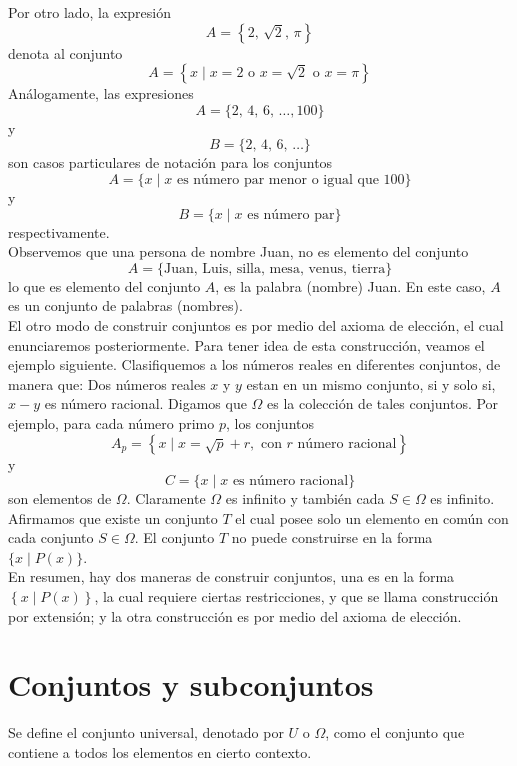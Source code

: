 Por otro lado, la expresión
$$A=\left\{2, \, \sqrt{2}, \, \pi \right\} $$
denota al conjunto
$$ A=\left\{x \mid x=2 \text { o } x=\sqrt{2} \text { o } x=\pi \right\}$$
Análogamente, las expresiones
$$ A=\{2,\, 4,\, 6, \, \dots, 100\} $$
y
$$B=\{2,\, 4, \, 6, \, \dots\}$$
son casos particulares de notación para los conjuntos
$$A=\{x \mid x \text { es número par menor o igual que } 100\}$$
y
$$B=\{x \mid x \text { es número par}\}$$
respectivamente.\\


Observemos que una persona de nombre Juan, no es elemento del conjunto
$$A=\{\text {Juan, Luis, silla, mesa, venus, tierra}\}$$
lo que es elemento del conjunto $A$, es la palabra (nombre) Juan. En este caso, $A$ es un conjunto de palabras (nombres).\\


El otro modo de construir conjuntos es por medio del axioma de elección, el cual enunciaremos posteriormente. Para tener idea de esta construcción, veamos el ejemplo siguiente. Clasifiquemos a los números reales en diferentes conjuntos, de manera que: Dos números reales $x$ y $y$ estan en un mismo conjunto, si y solo si, $x-y$ es número racional. Digamos que $\Omega$ es la colección de tales conjuntos. Por ejemplo, para cada número primo $p$, los conjuntos
$$A_p = \left\{x \mid x=\sqrt{p}+r, \text { con } r \text { número racional} \right\}$$
y
$$C = \{x \mid x \text{ es número racional}\}$$
son elementos de $\Omega$. Claramente $\Omega$ es infinito y también cada $S \in \Omega$ es infinito. Afirmamos que existe un conjunto $T$ el cual posee solo un elemento en común con cada conjunto $S \in \Omega$. El conjunto $T$ no puede construirse en la forma $\{x \mid P(x)\}$.\\


En resumen, hay dos maneras de construir conjuntos, una es en la forma $\left\{x \mid P(x) \right\}$, la cual requiere ciertas restricciones, y que se llama construcción por extensión; y la otra construcción es por medio del axioma de elección.

\section{Conjuntos y subconjuntos}

\begin{definicion}{}{}
    Se define el conjunto universal, denotado por $U$ o $\Omega$, como el conjunto que contiene a todos los elementos en cierto contexto.
\end{definicion}

